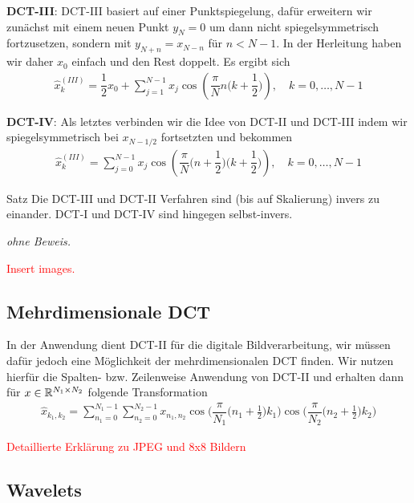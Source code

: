 \textbf{DCT-III}:
DCT-III basiert auf einer Punktspiegelung, dafür erweitern wir zunächst mit einem neuen Punkt $y_N=0$ um dann nicht 
spiegelsymmetrisch fortzusetzen, sondern mit $y_{N+n} = x_{N-n}$ für $n<N-1$. In der Herleitung haben wir daher 
$x_0$ einfach und den Rest doppelt. Es ergibt sich
%
\begin{align*}
  \hat{x}^{(III)}_k 
  = \dfrac{1}{2}x_0 + \sum_{j=1}^{N-1} x_j \cos\left(\dfrac{\pi}{N}n\Big(k+\dfrac{1}{2}\Big)\right), 
  \quad k=0,\dots,N-1
  \tag{III}\label{eq:DCTIIIeq}
\end{align*}
%

\textbf{DCT-IV}:
Als letztes verbinden wir die Idee von DCT-II und DCT-III indem wir spiegelsymmetrisch bei $x_{N-1/2}$ fortsetzten 
und bekommen
%
\begin{align*}
  \hat{x}^{(III)}_k 
  = \sum_{j=0}^{N-1} x_j \cos\left(\dfrac{\pi}{N}\Big(n+\dfrac{1}{2}\Big)\Big(k+\dfrac{1}{2}\Big)\right), 
  \quad k=0,\dots,N-1
  \tag{III}\label{eq:DCTIIIeq}
\end{align*}
%

\begin{colbox}{Satz}
  Die DCT-III und DCT-II Verfahren sind (bis auf Skalierung) invers zu einander. DCT-I und DCT-IV sind hingegen 
  selbst-invers.
\end{colbox}
\textit{ohne Beweis.}

\textcolor{red}{Insert images.}

\subsection{Mehrdimensionale DCT}
In der Anwendung dient DCT-II für die digitale Bildverarbeitung, wir müssen dafür jedoch eine Möglichkeit der 
mehrdimensionalen DCT finden. Wir nutzen hierfür die Spalten- bzw. Zeilenweise Anwendung von DCT-II und 
erhalten dann für $x\in\mathbb R^{N_1\times N_2}$ folgende Transformation
\begin{align*}
  \hat{x}_{k_1,k_2}
  = \sum_{n_1=0}^{N_1-1} \sum_{n_2=0}^{N_2-1}
  x_{n_1,n_2}
  \cos\Big(\dfrac{\pi}{N_1}\big(n_1+\tfrac{1}{2}\big)k_1\Big)
  \cos\Big(\dfrac{\pi}{N_2}\big(n_2+\tfrac{1}{2}\big)k_2\Big)
\end{align*}

\textcolor{red}{Detaillierte Erklärung zu JPEG und 8x8 Bildern}

\subsection{Wavelets}
